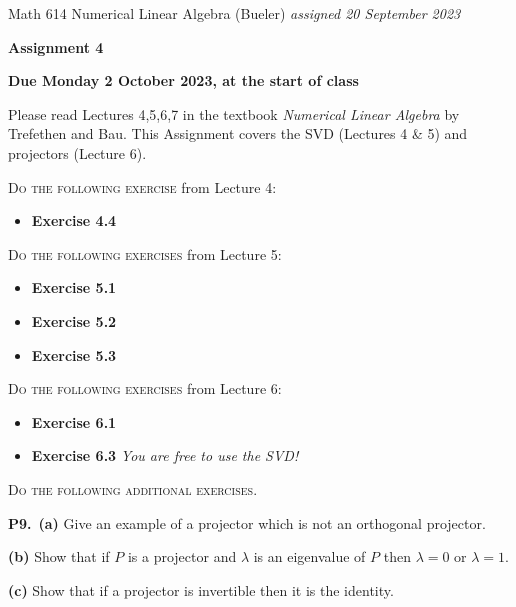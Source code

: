 \documentclass[12pt]{amsart}
\newcommand{\prob}[1]{\bigskip\noindent\textbf{#1.}\quad }
\newcommand{\epart}[1]{\medskip\noindent\textbf{(#1)}\quad }
\newcommand{\ppart}[1]{\,\textbf{(#1)}\quad }
\begin{document}
\scriptsize \noindent Math 614 Numerical Linear Algebra (Bueler) \hfill \emph{assigned 20 September 2023}
\normalsize\medskip

\Large\centerline{\textbf{Assignment 4}}
\large
\medskip

\centerline{\textbf{Due Monday 2 October 2023, at the start of class}}
\medskip
\normalsize

\thispagestyle{empty}

\bigskip
\noindent Please read Lectures 4,5,6,7 in the textbook \emph{Numerical Linear Algebra} by Trefethen and Bau.  This Assignment covers the SVD (Lectures 4 \& 5) and projectors (Lecture 6).

\bigskip
\noindent \textsc{Do the following exercise} from Lecture 4:

\begin{itemize}
\item \textbf{Exercise 4.4}
\end{itemize}

\bigskip
\noindent \textsc{Do the following exercises} from Lecture 5:

\begin{itemize}
\item \textbf{Exercise 5.1}
\item \textbf{Exercise 5.2}
\item \textbf{Exercise 5.3}
\end{itemize}

\bigskip
\noindent \textsc{Do the following exercises} from Lecture 6:

\begin{itemize}
\item \textbf{Exercise 6.1}
\item \textbf{Exercise 6.3} \qquad \emph{You are free to use the SVD!}
\end{itemize}


\bigskip
\noindent \textsc{Do the following additional exercises.}

\prob{P9}  \ppart{a} Give an example of a projector which is not an orthogonal projector.

\epart{b} Show that if $P$ is a projector and $\lambda$ is an eigenvalue of $P$ then $\lambda = 0$ or $\lambda = 1$.

\epart{c} Show that if a projector is invertible then it is the identity.
\end{document}
